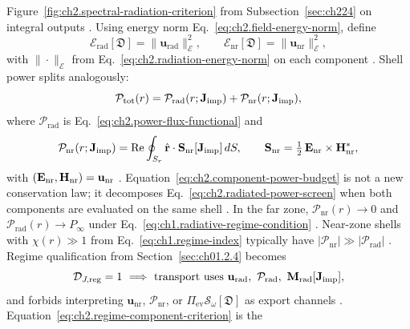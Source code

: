 Figure~\ref{fig:ch2.spectral-radiation-criterion} from Subsection~\ref{sec:ch224} on integral
outputs \cite{stratton1941}. Using energy norm Eq.~\eqref{eq:ch2.field-energy-norm}, define
\begin{equation}
\label{eq:ch2.radiative-energy-functional}
\mathcal{E}_{\mathrm{rad}}[\mathfrak{D}]
=
\|\mathbf{u}_{\mathrm{rad}}\|_{\mathcal{E}}^{2},
\qquad
\mathcal{E}_{\mathrm{nr}}[\mathfrak{D}]
=
\|\mathbf{u}_{\mathrm{nr}}\|_{\mathcal{E}}^{2},
\end{equation}
with \(\|\cdot\|_{\mathcal{E}}\) from Eq.~\eqref{eq:ch2.radiation-energy-norm} on each
component \cite{stratton1941}. Shell power splits analogously:
\begin{equation}
\label{eq:ch2.component-power-budget}
\mathcal{P}_{\mathrm{tot}}(r)
=
\mathcal{P}_{\mathrm{rad}}(r;\mathbf{J}_{\mathrm{imp}})
+\mathcal{P}_{\mathrm{nr}}(r;\mathbf{J}_{\mathrm{imp}}),
\end{equation}
where \(\mathcal{P}_{\mathrm{rad}}\) is Eq.~\eqref{eq:ch2.power-flux-functional} and
\begin{equation}
\label{eq:ch2.nonradiative-power-functional}
\mathcal{P}_{\mathrm{nr}}(r;\mathbf{J}_{\mathrm{imp}})
=
\Re\oint_{S_r}\hat{\mathbf{r}}\cdot\mathbf{S}_{\mathrm{nr}}[\mathbf{J}_{\mathrm{imp}}]\,dS,
\qquad
\mathbf{S}_{\mathrm{nr}}
=
\tfrac12\,\mathbf{E}_{\mathrm{nr}}\times\mathbf{H}_{\mathrm{nr}}^{*},
\end{equation}
with \((\mathbf{E}_{\mathrm{nr}},\mathbf{H}_{\mathrm{nr}})=\mathbf{u}_{\mathrm{nr}}\)
\cite{stratton1941}. Equation~\eqref{eq:ch2.component-power-budget} is not
a new conservation law; it decomposes Eq.~\eqref{eq:ch2.radiated-power-screen} when both
components are evaluated on the same shell \cite{stratton1941}. In the far zone,
\(\mathcal{P}_{\mathrm{nr}}(r)\to 0\) and \(\mathcal{P}_{\mathrm{rad}}(r)\to P_\infty\) under
Eq.~\eqref{eq:ch1.radiative-regime-condition} \cite{stratton1941}. Near-zone
shells with \(\chi(r)\gg 1\) from Eq.~\eqref{eq:ch1.regime-index} typically have
\(|\mathcal{P}_{\mathrm{nr}}|\gg|\mathcal{P}_{\mathrm{rad}}|\) \cite{stratton1941}.
Regime qualification from Section~\ref{sec:ch01.2.4} becomes
\begin{equation}
\label{eq:ch2.regime-component-criterion}
\mathcal{D}_{J,\mathrm{reg}}=1
\ \Longrightarrow\
\text{transport uses}\ \mathbf{u}_{\mathrm{rad}},\
\mathcal{P}_{\mathrm{rad}},\
\mathbf{M}_{\mathrm{rad}}[\mathbf{J}_{\mathrm{imp}}],
\end{equation}
and forbids interpreting \(\mathbf{u}_{\mathrm{nr}}\), \(\mathcal{P}_{\mathrm{nr}}\), or
\(\Pi_{\mathrm{ev}}\mathcal{S}_\omega[\mathfrak{D}]\) as export channels
\cite{stratton1941}. Equation~\eqref{eq:ch2.regime-component-criterion} is the
